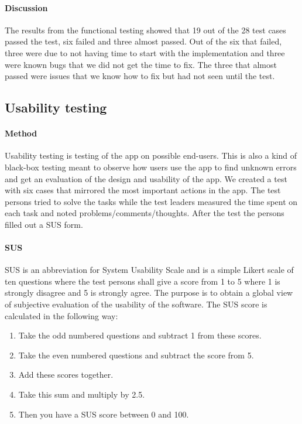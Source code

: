 			\paragraph{Discussion}
			The results from the functional testing showed that 19 out of the 28 test cases passed the test,  six failed and three almost passed. Out of the six that failed, three were due to not having time to start with the implementation and three were known bugs that we did not get the time to fix. The three that almost passed were issues that we know how to fix but had not seen until the test.
	\subsection{Usability testing}
		\paragraph{Method}
			Usability testing is testing of the app on possible end-users. This is also a kind of black-box testing meant to observe how users use the app to find unknown errors and get an evaluation of the design and usability of the app. We created a test with six cases that mirrored the most important actions in the app. The test persons tried to solve the tasks while the test leaders measured the time spent on each task and noted problems/comments/thoughts. After the test the persons filled out a SUS form.
\paragraph{SUS}
SUS is an abbreviation for System Usability Scale and is a simple Likert scale of ten questions where the test persons shall give a score from 1 to 5 where 1 is strongly disagree and 5 is strongly agree. The purpose is to obtain a global view of subjective evaluation of the usability of the software.
\newline
\newline
			The SUS score is calculated in the following way:
				\begin{enumerate}
					\item{}Take the odd numbered questions and subtract 1 from these scores.
					\item{}Take the even numbered questions and subtract the score from 5.
					\item{}Add these scores together. 
					\item{}Take this sum and multiply by 2.5.
					\item{}Then you have a SUS score between 0 and 100.
				\end{enumerate}
